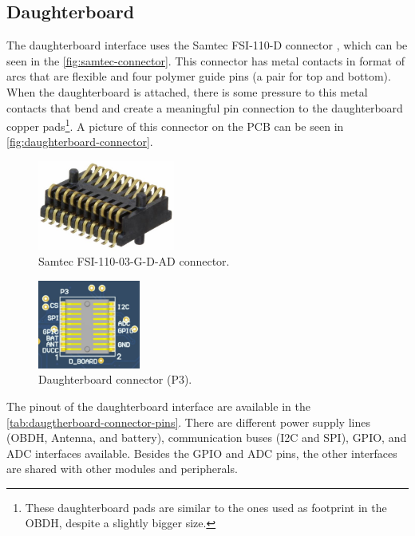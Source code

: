 \subsection{Daughterboard} \label{sec:daughterboard-interface}

The daughterboard interface uses the Samtec FSI-110-D connector \cite{fsi-conn}, which can be seen in the \autoref{fig:samtec-connector}. This connector has metal contacts in format of arcs that are flexible and four polymer guide pins (a pair for top and bottom). When the daughterboard is attached, there is some pressure to this metal contacts that bend and create a meaningful pin connection to the daughterboard copper pads\footnote{These daughterboard pads are similar to the ones used as footprint in the OBDH, despite a slightly bigger size.}. A picture of this connector on the PCB can be seen in \autoref{fig:daughterboard-connector}.

\begin{figure}[!ht]
    \begin{center}
        \includegraphics[width=0.4\textwidth]{figures/samtec_fsi-110-03-g-d-ad.jpeg}
        \caption{Samtec FSI-110-03-G-D-AD connector.}
        \label{fig:samtec-connector}
    \end{center}
\end{figure}

\begin{figure}[!ht]
    \begin{center}
        \includegraphics[width=0.3\textwidth]{figures/p3-connector.png}
        \caption{Daughterboard connector (P3).}
        \label{fig:daughterboard-connector}
    \end{center}
\end{figure}

The pinout of the daughterboard interface are available in the \autoref{tab:daugtherboard-connector-pins}. There are different power supply lines (OBDH, Antenna, and battery), communication buses (I2C and SPI), GPIO, and ADC interfaces available. Besides the GPIO and ADC pins, the other interfaces are shared with other modules and peripherals.

